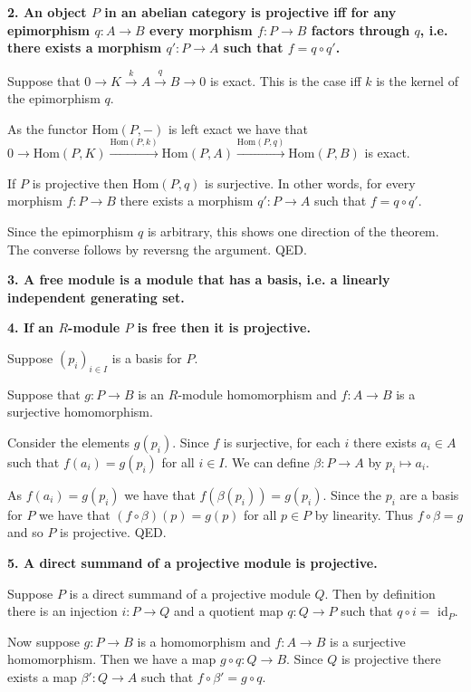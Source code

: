 \documentclass[12pt]{article}
\begin{document}
\textbf{2. An object $P$ in an abelian category is projective iff for any epimorphism $q : A \to B$ every morphism $f : P \to B$ factors through $q$, i.e. there exists a morphism $q' : P \to A$ such that $f = q\circ q'$.}

Suppose that $0 \rightarrow K \overset{k}{\rightarrow} A \overset{q}{\rightarrow} B \rightarrow 0$ is exact. This is the case iff $k$ is the kernel of the epimorphism $q$.

As the functor Hom$(P, -)$ is left exact we have that $0 \rightarrow \mbox{Hom}(P, K) \overset{\mbox{Hom}(P, k)}{\rightarrow} \mbox{Hom}(P, A) \overset{\mbox{Hom}(P, q)}{\rightarrow}  \mbox{Hom}(P, B)$ is exact.

If $P$ is projective then $\mbox{Hom}(P, q)$ is surjective. In other words, for every morphism $f : P \to B$ there exists a morphism $q' : P \to A$ such that $f = q\circ q'$.

Since the epimorphism $q$ is arbitrary, this shows one direction of the theorem. The converse follows by reversng the argument. QED.

\textbf{3. A free module is a module that has a basis, i.e. a linearly independent generating set.}

\textbf{4. If an $R$-module $P$ is free then it is projective.}

Suppose $(p_i)_{i\in I}$ is a basis for $P$.

Suppose that $g : P \to B$ is an $R$-module homomorphism and $f : A \to B$ is a surjective homomorphism. 

Consider the elements $g(p_i)$. Since $f$ is surjective, for each $i$ there exists $a_i \in A$ such that $f(a_i) = g(p_i)$ for all $i \in I$. We can define $\beta : P \to A$ by $p_i \mapsto a_i$.

As $f(a_i) = g(p_i)$ we have that $f(\beta(p_i)) = g(p_i)$. Since the $p_i$ are a basis for $P$ we have that $(f\circ \beta)(p) = g(p)$ for all $p \in P$ by linearity. Thus $f\circ \beta = g$ and so $P$ is projective. QED.

\textbf{5. A direct summand of a projective module is projective.}

Suppose $P$ is a direct summand of a projective module $Q$. Then by definition there is an injection $i : P \to Q$ and a quotient map $q : Q \to P$ such that $q\circ i =$ id$_P$.

Now suppose $g : P \to B$ is a homomorphism and $f : A \to B$ is a surjective homomorphism. Then we have a map $g\circ q : Q \to B$. Since $Q$ is projective there exists a map $\beta' : Q \to A$ such that $f\circ \beta' = g\circ q$.
\end{document}
